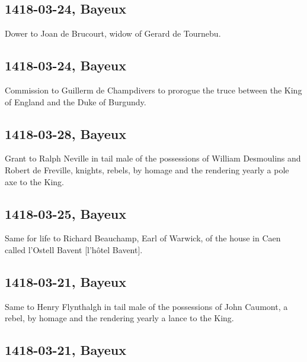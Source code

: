 \documentclass[a4paper,12pt,twoside]{book}
\begin{document}
            \subsection{1418-03-24, Bayeux}
            
                  Dower to Joan de Brucourt, widow of Gerard de Tournebu.
               
            \subsection{1418-03-24, Bayeux}
            
                  Commission to Guillerm de Champdivers to prorogue the truce between the King of England and the Duke of Burgundy.
               
            \subsection{1418-03-28, Bayeux}
            
                  Grant to Ralph Neville in tail male of the possessions of William Desmoulins and Robert de Freville, knights, rebels, by homage and the rendering yearly a pole axe to the King.
               
            \subsection{1418-03-25, Bayeux}
            
                  Same for life to Richard Beauchamp, Earl of Warwick, of the house in Caen called l'Ostell Bavent [l’hôtel Bavent].
               
            \subsection{1418-03-21, Bayeux}
            
                  Same to Henry Flynthalgh in tail male of the possessions of John Caumont, a rebel, by homage and the rendering yearly a lance to the King.
               
            \subsection{1418-03-21, Bayeux}
            
\end{document}
